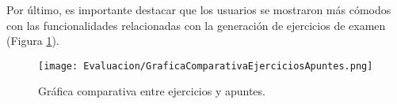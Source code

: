 Por último, es importante destacar que los usuarios se mostraron más cómodos con las funcionalidades relacionadas con la generación de ejercicios de examen (Figura \ref{fig:graficaComparativaEjerciciosApuntes}).

\begin{figure}[H]
    \centering
    \texttt{[image: Evaluacion/GraficaComparativaEjerciciosApuntes.png]}
    \caption{Gráfica comparativa entre ejercicios y apuntes.}
    \label{fig:graficaComparativaEjerciciosApuntes}
\end{figure}